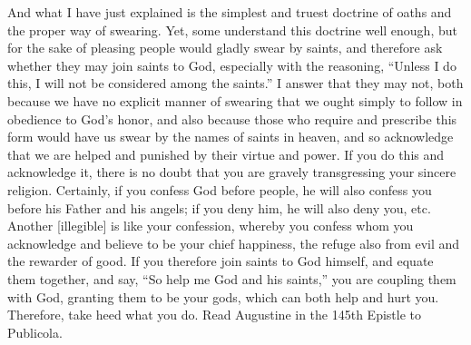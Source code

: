 And what I have just explained is the simplest and truest doctrine of oaths and the proper way of swearing. Yet, some understand this doctrine well enough, but for the sake of pleasing people would gladly swear by saints, and therefore ask whether they may join saints to God, especially with the reasoning, “Unless I do this, I will not be considered among the saints.” I answer that they may not, both because we have no explicit manner of swearing that we ought simply to follow in obedience to God’s honor, and also because those who require and prescribe this form would have us swear by the names of saints in heaven, and so acknowledge that we are helped and punished by their virtue and power. If you do this and acknowledge it, there is no doubt that you are gravely transgressing your sincere religion. Certainly, if you confess God before people, he will also confess you before his Father and his angels; if you deny him, he will also deny you, etc. Another [illegible] is like your confession, whereby you confess whom you acknowledge and believe to be your chief happiness, the refuge also from evil and the rewarder of good. If you therefore join saints to God himself, and equate them together, and say, “So help me God and his saints,” you are coupling them with God, granting them to be your gods, which can both help and hurt you. Therefore, take heed what you do. Read Augustine in the 145th Epistle to Publicola.

